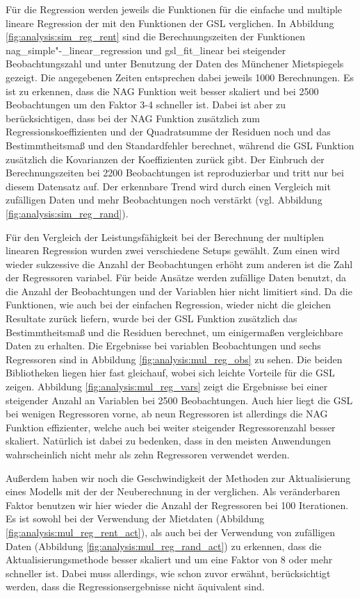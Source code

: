Für die Regression werden jeweils die Funktionen für die einfache und multiple lineare Regression der \naglib mit den Funktionen der GSL verglichen.
In Abbildung \ref{fig:analysis:sim_reg_rent} sind die Berechnungszeiten der Funktionen nag\_simple"-\_linear\_regression und gsl\_fit\_linear bei steigender Beobachtungszahl und unter Benutzung der Daten des Münchener Mietspiegels gezeigt.
Die angegebenen Zeiten entsprechen dabei jeweils 1000 Berechnungen.
Es ist zu erkennen, dass die NAG Funktion weit besser skaliert und bei 2500 Beobachtungen um den Faktor 3-4 schneller ist.
Dabei ist aber zu berücksichtigen, dass bei der NAG Funktion zusätzlich zum Regressionskoeffizienten und der Quadratsumme der Residuen noch und das Bestimmtheitsmaß und den Standardfehler berechnet, während die GSL Funktion zusätzlich die Kovarianzen der Koeffizienten zurück gibt.
Der Einbruch der Berechnungszeiten bei 2200 Beobachtungen ist reproduzierbar und tritt nur bei diesem Datensatz auf.
Der erkennbare Trend wird durch einen Vergleich mit zufälligen Daten und mehr Beobachtungen noch verstärkt (vgl. Abbildung \ref{fig:analysis:sim_reg_rand}).

Für den Vergleich der Leistungsfähigkeit bei der Berechnung der multiplen linearen Regression wurden zwei verschiedene Setups gewählt.
Zum einen wird wieder sukzessive die Anzahl der Beobachtungen erhöht zum anderen ist die Zahl der Regressoren variabel. 
Für beide Ansätze werden zufällige Daten benutzt, da die Anzahl der Beobachtungen und der Variablen hier nicht limitiert sind.
Da die Funktionen, wie auch bei der einfachen Regression, wieder nicht die gleichen Resultate zurück liefern, wurde bei der GSL Funktion zusätzlich das Bestimmtheitsmaß und die Residuen berechnet, um einigermaßen vergleichbare Daten zu erhalten.
Die Ergebnisse bei variablen Beobachtungen und sechs Regressoren sind in Abbildung \ref{fig:analysis:mul_reg_obs} zu sehen.
Die beiden Bibliotheken liegen hier fast gleichauf, wobei sich leichte Vorteile für die GSL zeigen.
Abbildung \ref{fig:analysis:mul_reg_vars} zeigt die Ergebnisse bei einer steigender Anzahl an Variablen bei 2500 Beobachtungen.
Auch hier liegt die GSL bei wenigen Regressoren vorne, ab neun Regressoren ist allerdings die NAG Funktion effizienter, welche auch bei weiter steigender Regressorenzahl besser skaliert.
Natürlich ist dabei zu bedenken, dass in den meisten Anwendungen wahrscheinlich nicht mehr als zehn Regressoren verwendet werden.

Außerdem haben wir noch die Geschwindigkeit der Methoden zur Aktualisierung eines Modells mit der der Neuberechnung in der \naglib verglichen.
Als veränderbaren Faktor benutzen wir hier wieder die Anzahl der Regressoren bei 100 Iterationen.
Es ist sowohl bei der Verwendung der Mietdaten (Abbildung \ref{fig:analysis:mul_reg_rent_act}), als auch bei der Verwendung von zufälligen Daten (Abbildung \ref{fig:analysis:mul_reg_rand_act}) zu erkennen, dass die Aktualisierungsmethode besser skaliert und um eine Faktor von 8 oder mehr schneller ist.
Dabei muss allerdings, wie schon zuvor erwähnt, berücksichtigt werden, dass die Regressionsergebnisse nicht äquivalent sind.

